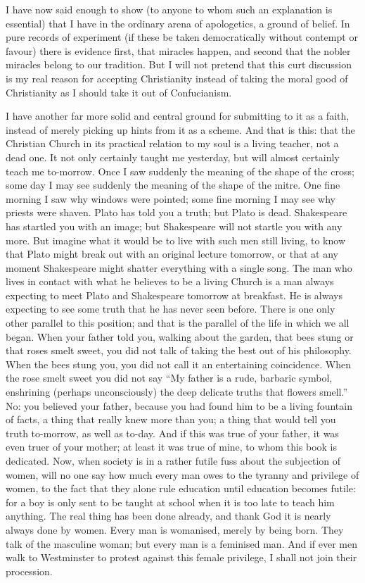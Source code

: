 \documentclass{book}
\begin{document}
I have now said enough to show (to anyone to whom such an explanation is essential) that I have in the ordinary arena of apologetics, a ground of belief. In pure records of experiment (if these be taken democratically without contempt or favour) there is evidence first, that miracles happen, and second that the nobler miracles belong to our tradition. But I will not pretend that this curt discussion is my real reason for accepting Christianity instead of taking the moral good of Christianity as I should take it out of Confucianism.

I have another far more solid and central ground for submitting to it as a faith, instead of merely picking up hints from it as a scheme. And that is this: that the Christian Church in its practical relation to my soul is a living teacher, not a dead one. It not only certainly taught me yesterday, but will almost certainly teach me to-morrow. Once I saw suddenly the meaning of the shape of the cross; some day I may see suddenly the meaning of the shape of the mitre. One fine morning I saw why windows were pointed; some fine morning I may see why priests were shaven. Plato has told you a truth; but Plato is dead. Shakespeare has startled you with an image; but Shakespeare will not startle you with any more. But imagine what it would be to live with such men still living, to know that Plato might break out with an original lecture tomorrow, or that at any moment Shakespeare might shatter everything with a single song. The man who lives in contact with what he believes to be a living Church is a man always expecting to meet Plato and Shakespeare tomorrow at breakfast. He is always expecting to see some truth that he has never seen before. There is one only other parallel to this position; and that is the parallel of the life in which we all began. When your father told you, walking about the garden, that bees stung or that roses smelt sweet, you did not talk of taking the best out of his philosophy. When the bees stung you, you did not call it an entertaining coincidence. When the rose smelt sweet you did not say “My father is a rude, barbaric symbol, enshrining (perhaps unconsciously) the deep delicate truths that flowers smell.” No: you believed your father, because you had found him to be a living fountain of facts, a thing that really knew more than you; a thing that would tell you truth to-morrow, as well as to-day. And if this was true of your father, it was even truer of your mother; at least it was true of mine, to whom this book is dedicated. Now, when society is in a rather futile fuss about the subjection of women, will no one say how much every man owes to the tyranny and privilege of women, to the fact that they alone rule education until education becomes futile: for a boy is only sent to be taught at school when it is too late to teach him anything. The real thing has been done already, and thank God it is nearly always done by women. Every man is womanised, merely by being born. They talk of the masculine woman; but every man is a feminised man. And if ever men walk to Westminster to protest against this female privilege, I shall not join their procession.
\end{document}
